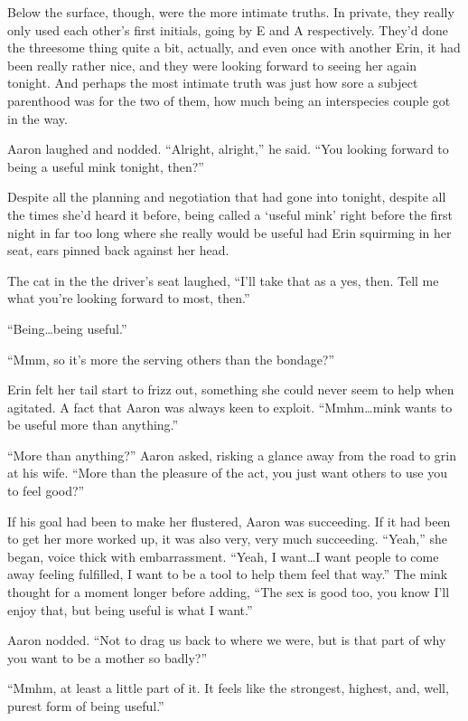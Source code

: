 Below the surface, though, were the more intimate truths. In private,
they really only used each other's first initials, going by E and A
respectively. They'd done the threesome thing quite a bit, actually, and
even once with another Erin, it had been really rather nice, and they
were looking forward to seeing her again tonight. And perhaps the most
intimate truth was just how sore a subject parenthood was for the two of
them, how much being an interspecies couple got in the way.

Aaron laughed and nodded. ``Alright, alright,'' he said. ``You looking
forward to being a useful mink tonight, then?''

Despite all the planning and negotiation that had gone into tonight,
despite all the times she'd heard it before, being called a `useful
mink' right before the first night in far too long where she really
would be useful had Erin squirming in her seat, ears pinned back against
her head.

The cat in the the driver's seat laughed, ``I'll take that as a yes,
then. Tell me what you're looking forward to most, then.''

``Being\ldots{}being useful.''

``Mmm, so it's more the serving others than the bondage?''

Erin felt her tail start to frizz out, something she could never seem to
help when agitated. A fact that Aaron was always keen to exploit.
``Mmhm\ldots{}mink wants to be useful more than anything.''

``More than anything?'' Aaron asked, risking a glance away from the road
to grin at his wife. ``More than the pleasure of the act, you just want
others to use you to feel good?''

If his goal had been to make her flustered, Aaron was succeeding. If it
had been to get her more worked up, it was also very, very much
succeeding. ``Yeah,'' she began, voice thick with embarrassment. ``Yeah,
I want\ldots{}I want people to come away feeling fulfilled, I want to be
a tool to help them feel that way.'' The mink thought for a moment
longer before adding, ``The sex is good too, you know I'll enjoy that,
but being useful is what I want.''

Aaron nodded. ``Not to drag us back to where we were, but is that part
of why you want to be a mother so badly?''

``Mmhm, at least a little part of it. It feels like the strongest,
highest, and, well, purest form of being useful.''

